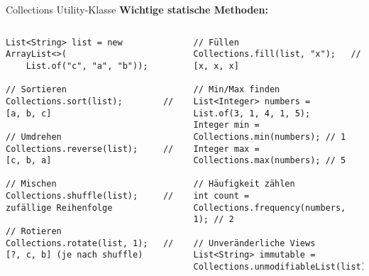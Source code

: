 \begin{frame}[fragile]{Collections Utility-Klasse}
  \textbf{Wichtige statische Methoden:}

  \begin{columns}[T]
    \begin{lstlisting}[style=java, basicstyle=\tiny\ttfamily]
List<String> list = new ArrayList<>(
    List.of("c", "a", "b"));

// Sortieren
Collections.sort(list);        // [a, b, c]

// Umdrehen
Collections.reverse(list);     // [c, b, a]

// Mischen
Collections.shuffle(list);     // zufällige Reihenfolge

// Rotieren
Collections.rotate(list, 1);   // [?, c, b] (je nach shuffle)
    \end{lstlisting}

    \begin{lstlisting}[style=java, basicstyle=\tiny\ttfamily]
// Füllen
Collections.fill(list, "x");   // [x, x, x]

// Min/Max finden
List<Integer> numbers = List.of(3, 1, 4, 1, 5);
Integer min = Collections.min(numbers); // 1
Integer max = Collections.max(numbers); // 5

// Häufigkeit zählen
int count = Collections.frequency(numbers, 1); // 2

// Unveränderliche Views
List<String> immutable = Collections.unmodifiableList(list);
    \end{lstlisting}
  \end{columns}
\end{frame}

